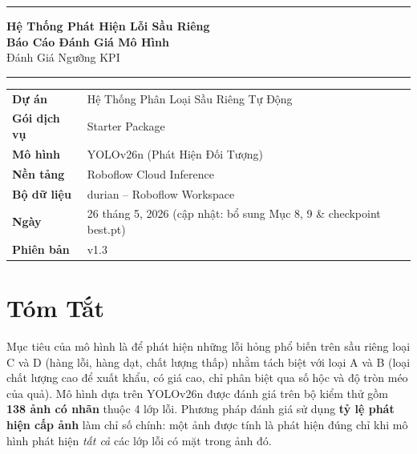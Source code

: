 \documentclass[12pt, a4paper]{article}
\begin{document}
\begin{titlepage}
  \centering
  \vspace*{2cm}

  {\color{primary}\rule{\linewidth}{2pt}}
  \vspace{0.5cm}

  {\Huge\bfseries Hệ Thống Phát Hiện Lỗi Sầu Riêng}\\[0.4cm]
  {\Large\bfseries Báo Cáo Đánh Giá Mô Hình}\\[0.2cm]
  {\large\color{darkgray} Đánh Giá Ngưỡng KPI}

  \vspace{0.5cm}
  {\color{primary}\rule{\linewidth}{2pt}}

  \vspace{1.5cm}

  \begin{tabular}{L{4.5cm} L{7cm}}
    \textbf{Dự án}           & Hệ Thống Phân Loại Sầu Riêng Tự Động \\[4pt]
    \textbf{Gói dịch vụ}     & Starter Package \\[4pt]
    \textbf{Mô hình}         & YOLOv26n (Phát Hiện Đối Tượng) \\[4pt]
    \textbf{Nền tảng}        & Roboflow Cloud Inference \\[4pt]
    \textbf{Bộ dữ liệu}      & durian -- Roboflow Workspace \\[4pt]
    \textbf{Ngày}            & 26 tháng 5, 2026 (cập nhật: bổ sung Mục 8, 9 \& checkpoint best.pt) \\[4pt]
    \textbf{Phiên bản}       & v1.3 \\
  \end{tabular}

\end{titlepage}

\section{Tóm Tắt}

Mục tiêu của mô hình là để phát hiện những lỗi hỏng phổ biến trên sầu riêng loại C và D (hàng lỗi, hàng dạt, chất lượng thấp) nhằm tách biệt với loại A và B (loại chất lượng cao để xuất khẩu, có giá cao, chỉ phân biệt qua số hộc và độ tròn méo của quả). Mô hình dựa trên YOLOv26n được đánh giá trên bộ kiểm thử gồm \textbf{138 ảnh có nhãn} thuộc 4 lớp lỗi. Phương pháp đánh giá sử dụng \textbf{tỷ lệ phát hiện cấp ảnh} làm chỉ số chính: một ảnh được tính là phát hiện đúng chỉ khi mô hình phát hiện \textit{tất cả} các lớp lỗi có mặt trong ảnh đó.
\end{document}
